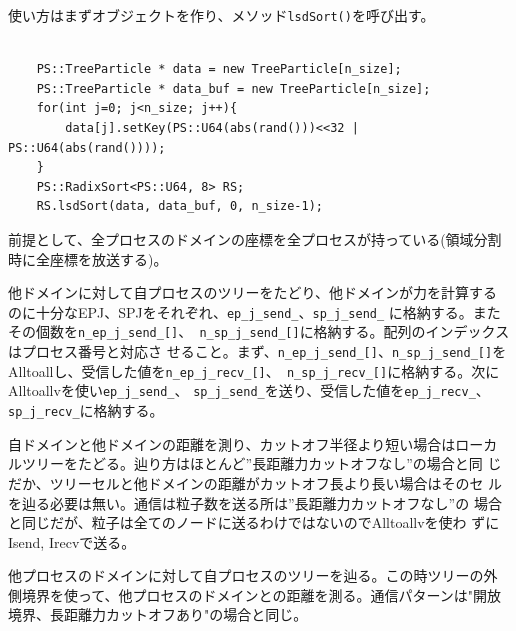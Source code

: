 使い方はまずオブジェクトを作り、メソッド{\tt lsdSort()}を呼び出す。
\begin{lstlisting}[caption=RadixSortの例]

    PS::TreeParticle * data = new TreeParticle[n_size];
    PS::TreeParticle * data_buf = new TreeParticle[n_size];
    for(int j=0; j<n_size; j++){
        data[j].setKey(PS::U64(abs(rand()))<<32 | PS::U64(abs(rand())));
    }
    PS::RadixSort<PS::U64, 8> RS;
    RS.lsdSort(data, data_buf, 0, n_size-1);

\end{lstlisting}


前提として、全プロセスのドメインの座標を全プロセスが持っている(領域分割
時に全座標を放送する)。


他ドメインに対して自プロセスのツリーをたどり、他ドメインが力を計算する
のに十分なEPJ、SPJをそれぞれ、{\tt ep\_j\_send\_}、{\tt sp\_j\_send\_}
に格納する。またその個数を{\tt n\_ep\_j\_send\_[]}、{\tt
n\_sp\_j\_send\_[]}に格納する。配列のインデックスはプロセス番号と対応さ
せること。まず、{\tt n\_ep\_j\_send\_[]}、{\tt n\_sp\_j\_send\_[]}を
Alltoallし、受信した値を{\tt n\_ep\_j\_recv\_[]}、{\tt
n\_sp\_j\_recv\_[]}に格納する。次にAlltoallvを使い{\tt ep\_j\_send\_}、
{\tt sp\_j\_send\_}を送り、受信した値を{\tt ep\_j\_recv\_}、{\tt
sp\_j\_recv\_}に格納する。


自ドメインと他ドメインの距離を測り、カットオフ半径より短い場合はローカ
ルツリーをたどる。辿り方はほとんど”長距離力カットオフなし”の場合と同
じだか、ツリーセルと他ドメインの距離がカットオフ長より長い場合はそのセ
ルを辿る必要は無い。通信は粒子数を送る所は”長距離力カットオフなし”の
場合と同じだが、粒子は全てのノードに送るわけではないのでAlltoallvを使わ
ずにIsend, Irecvで送る。



他プロセスのドメインに対して自プロセスのツリーを辿る。この時ツリーの外
側境界を使って、他プロセスのドメインとの距離を測る。通信パターンは"開放
境界、長距離力カットオフあり"の場合と同じ。



